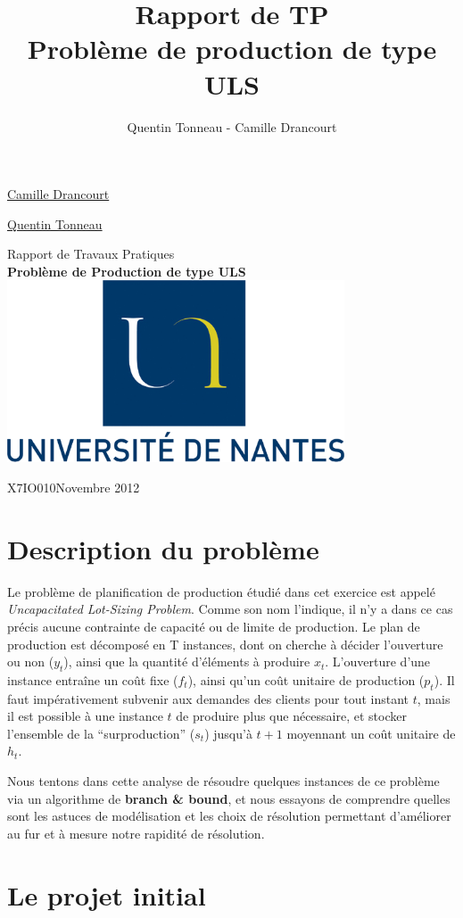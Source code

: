 \documentclass[a4paper,11pt,twoside]{report}
\title {Rapport de TP \\ Problème de production de type ULS}
\author {Quentin Tonneau - Camille Drancourt}
\date{}
\begin{document}
\thispagestyle{empty}
\Large{\uline{
\noindent Camille Drancourt}


\uline{Quentin Tonneau}}
\vfill
\begin{center}
\Huge{
 Rapport de Travaux Pratiques\\
 \textbf{Problème de Production de type ULS}}
 \vfill
 \includegraphics[width=0.75\textwidth]{logo_univ_nantes.png}
 \vfill
\end{center}
X7IO010\hfill Novembre 2012
\newpage \pagestyle{empty}~
\tableofcontents
\newpage
\pagestyle{plain}
\chapter{Description du problème}
Le problème de planification de production étudié dans cet exercice est appelé \textit{Uncapacitated Lot-Sizing Problem}. Comme son nom l'indique, il n'y a dans ce cas précis aucune contrainte de capacité ou de limite de production.
Le plan de production est décomposé en T instances, dont on cherche à décider l'ouverture ou non ($y_t$), ainsi que la quantité d'éléments à produire $x_t$. L'ouverture d'une instance entraîne un coût fixe ($f_t$), ainsi qu'un coût unitaire de production ($p_t$).
Il faut impérativement subvenir aux demandes des clients pour tout instant $t$, mais il est possible à une instance $t$ de produire plus que nécessaire, et stocker l'ensemble de la ``surproduction'' ($s_t$) jusqu'à $t+1$ moyennant un coût unitaire de $h_t$.


Nous tentons dans cette analyse de résoudre quelques instances de ce problème via un algorithme de \textbf{branch \& bound}, et nous essayons de comprendre quelles sont les astuces de modélisation et les choix de résolution permettant d'améliorer au fur et à mesure notre rapidité de résolution.

\chapter{Le projet initial}
\end{document}
